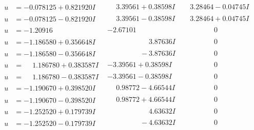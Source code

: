 \documentclass[1p]{elsarticle_modified}
\theoremstyle{definition}
\begin{document}
$$\begin{array}{c|c|c}
\begin{aligned}
u &= -0.078125 + 0.821920 I\end{aligned}
 & \phantom{-}3.39561 + 0.38598 I & \phantom{-}3.28464 - 0.04745 I \\ \hline\begin{aligned}
u &= -0.078125 - 0.821920 I\end{aligned}
 & \phantom{-}3.39561 - 0.38598 I & \phantom{-}3.28464 + 0.04745 I \\ \hline\begin{aligned}
u &= -1.20916\phantom{ +0.000000I}\end{aligned}
 & -2.67101\phantom{ +0.000000I} & \phantom{-0.000000 } 0 \\ \hline\begin{aligned}
u &= -1.186580 + 0.356648 I\end{aligned}
 & \phantom{-0.000000 -}3.87636 I & \phantom{-0.000000 } 0 \\ \hline\begin{aligned}
u &= -1.186580 - 0.356648 I\end{aligned}
 & \phantom{-0.000000 } -3.87636 I & \phantom{-0.000000 } 0 \\ \hline\begin{aligned}
u &= \phantom{-}1.186780 + 0.383587 I\end{aligned}
 & -3.39561 + 0.38598 I & \phantom{-0.000000 } 0 \\ \hline\begin{aligned}
u &= \phantom{-}1.186780 - 0.383587 I\end{aligned}
 & -3.39561 - 0.38598 I & \phantom{-0.000000 } 0 \\ \hline\begin{aligned}
u &= -1.190670 + 0.398520 I\end{aligned}
 & \phantom{-}0.98772 - 4.66544 I & \phantom{-0.000000 } 0 \\ \hline\begin{aligned}
u &= -1.190670 - 0.398520 I\end{aligned}
 & \phantom{-}0.98772 + 4.66544 I & \phantom{-0.000000 } 0 \\ \hline\begin{aligned}
u &= -1.252520 + 0.179739 I\end{aligned}
 & \phantom{-0.000000 -}4.63632 I & \phantom{-0.000000 } 0 \\ \hline\begin{aligned}
u &= -1.252520 - 0.179739 I\end{aligned}
 & \phantom{-0.000000 } -4.63632 I & \phantom{-0.000000 } 0 \\ \hline\begin{aligned}

\end{aligned}
\end{array}$$
\end{document}
